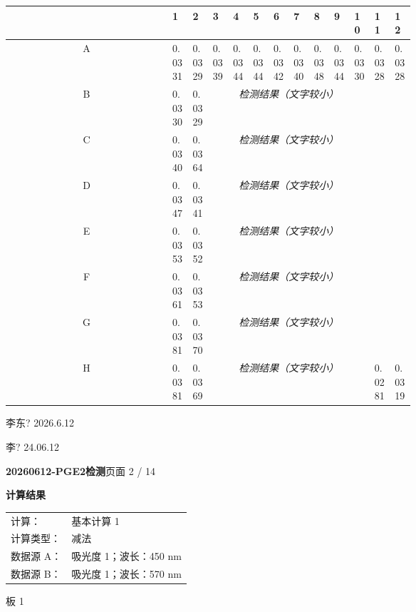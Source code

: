 \documentclass[UTF8,10pt,a4paper,fontset=fandol]{ctexart}
\newcommand{\handwritten}[1]{#1}
\begin{document}
\begin{center}
\small
\begin{tabular}{c|*{12}{p{0.055\linewidth}|}}
 & 1 & 2 & 3 & 4 & 5 & 6 & 7 & 8 & 9 & 10 & 11 & 12\\ \hline
A & 0.0331 & 0.0329 & 0.0339 & 0.0344 & 0.0344 & 0.0342 & 0.0340 & 0.0348 & 0.0344 & 0.0330 & 0.0328 & 0.0328\\ \hline
B & 0.0330 & 0.0329 & \multicolumn{8}{c|}{\textit{检测结果（文字较小）}} & & \\ \hline
C & 0.0340 & 0.0364 & \multicolumn{8}{c|}{\textit{检测结果（文字较小）}} & & \\ \hline
D & 0.0347 & 0.0341 & \multicolumn{8}{c|}{\textit{检测结果（文字较小）}} & & \\ \hline
E & 0.0353 & 0.0352 & \multicolumn{8}{c|}{\textit{检测结果（文字较小）}} & & \\ \hline
F & 0.0361 & 0.0353 & \multicolumn{8}{c|}{\textit{检测结果（文字较小）}} & & \\ \hline
G & 0.0381 & 0.0370 & \multicolumn{8}{c|}{\textit{检测结果（文字较小）}} & & \\ \hline
H & 0.0381 & 0.0369 & \multicolumn{8}{c|}{\textit{检测结果（文字较小）}} & 0.0281 & 0.0319\\ \hline
\end{tabular}
\end{center}


\handwritten{李东? 2026.6.12}

\handwritten{李? 24.06.12}

\newpage

\noindent\textbf{20260612-PGE2检测}\hfill 页面 2 / 14

\medskip
\noindent\textbf{计算结果}

\noindent
\begin{tabular}{@{}ll@{}}
计算： & 基本计算 1\\
计算类型： & 减法\\
数据源 A： & 吸光度 1；波长：450 nm\\
数据源 B： & 吸光度 1；波长：570 nm
\end{tabular}

\medskip
\noindent 板 1
\end{document}
